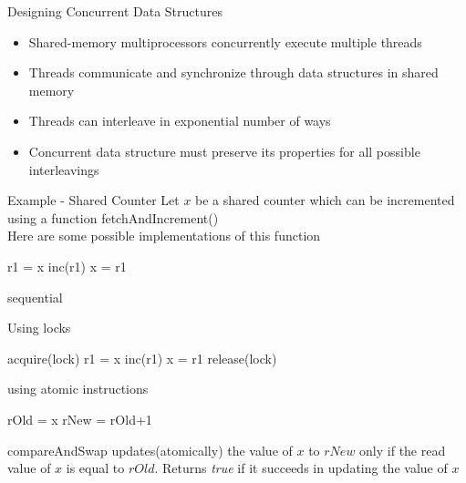 \begin{frame}{Designing Concurrent Data Structures}
\begin{itemize}
\item Shared-memory multiprocessors concurrently execute multiple threads
\item Threads communicate and synchronize through data structures in shared memory
\item Threads can interleave in exponential number of ways
\item Concurrent data structure must preserve its properties for all possible interleavings
\end{itemize}
\end{frame}

\begin{frame}{Example - Shared Counter}
Let $x$ be a shared counter which can be incremented using a function fetchAndIncrement()\\
\pause
Here are some possible implementations of this function\\
\phantom{hello world}
\renewcommand{\thealgocf}{}
\begin{minipage}[t]{0.48\textwidth}
\begin{algorithm}[H]
\phantom{acquire(lock)\;}
r1 = x\;
inc(r1)\;
x = r1\;
\phantom{release(lock)\;}

\caption{\tiny sequential}
\end{algorithm}
\pause
\end{minipage}
\begin{minipage}[t]{0.48\textwidth}
\begin{algorithm}[H]
\caption{\tiny Using locks}
acquire(lock)\;
r1 = x\;
inc(r1)\;
x = r1\;
release(lock)\;

\end{algorithm}
\end{minipage}
\pause
\begin{center}
\begin{minipage}[t]{0.65\textwidth}
\begin{algorithm}[H]
\caption{\tiny using atomic instructions}
{
rOld = x\;
rNew = rOld+1\;
}
\end{algorithm}
\end{minipage}
\end{center}
\footnotesize compareAndSwap updates(atomically) the value of $x$ to $rNew$ only if the read value of $x$ is equal to $rOld$. Returns \textit{true} if it succeeds in updating the value of $x$
\end{frame}

